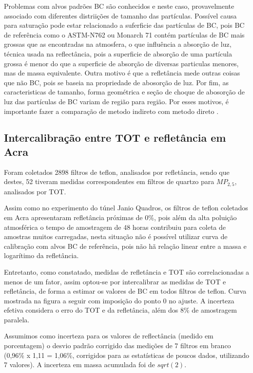 Problemas com alvos padrões BC são conhecidos e neste caso, 
provavelmente associado com diferentes distriições de tamanho das partículas.
Possível causa para saturação pode estar relacionado a suferficie das partículas 
de BC, pois BC de referência como o ASTM-N762 ou Monarch 71 contém partículas
de BC mais grossas que as encontradas na atmosfera, o que influência a 
absorção de luz, técnica usada na reflectância, pois a superficie de absorção
de uma partícula grossa é menor do que a superficie de absorção de diversas
particulas menores, mas de massa equivalente. Outra motivo é que a refletância
mede outras coisas que não BC, pois se baseia na propriedade de abosorção de luz.
Por fim, as caracteristicas de tamanho, forma geométrica e seção de choque
de abosorção de luz das partículas de BC variam de região para região.
Por esses motivos, é importante fazer a comparação de metodo indireto com 
metodo direto \citep{quincey2007}.

\newpage
\subsection{Intercalibração entre TOT e refletância em Acra}

Foram coletados 2898 filtros de teflon, analisados por refletância,
sendo que destes, 52 tiveram medidas correspondentes em filtros de quartzo 
para $MP_{2,5}$, analisados por TOT.

Assim como no experimento do túnel Janio Quadros, os filtros de teflon 
coletados em Acra apresentaram refletância próximas de 0\%, pois além 
da alta poluição atmosférica o tempo de amostragem de 48 horas contribuiu 
para coleta de amostras muitos carregadas, nesta situação não é possível 
utilizar curva de calibração com alvos BC de referência, pois
não hã relação linear entre a massa e logarítimo da refletância.

Entretanto, como constatado, medidas de refletância e TOT são correlacionadas 
a menos de um fator, assim optou-se por intercalibrar as medidas de 
TOT e refletância, de forma a estimar os valores de BC em todos filtros
de teflon. Curva mostrada na figura a seguir com imposição do ponto 0 no ajuste.
A incerteza efetiva considera o erro do TOT e da refletância, além dos 8\% de 
amostragem paralela. 

Assumimos como incerteza para os valores de reflectância (medido em porcentagem)
o desvio padrão corrigido das medições de 7 filtros em branco 
(0,96\% x 1,11 = 1,06\%, corrigidos para as estatísticas de poucos dados, 
utilizando 7 valores). A incerteza em massa acumulada foi de $sqrt(2)$.

